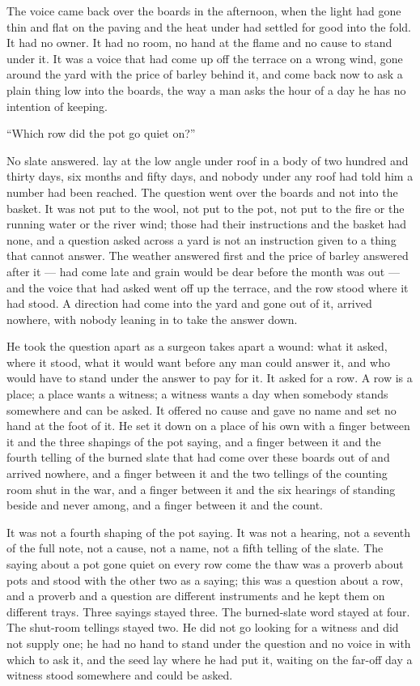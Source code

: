 The voice came back over the boards in the afternoon, when the light had gone thin and flat on the paving and the heat under  had settled for good into the fold. It had no owner. It had no room, no hand at the flame and no cause to stand under it. It was a voice that had come up off the terrace on a wrong wind, gone around the yard with the price of barley behind it, and come back now to ask a plain thing low into the boards, the way a man asks the hour of a day he has no intention of keeping.

“Which row did the pot go quiet on?”

No slate answered.  lay at the low angle under  roof in a body of two hundred and thirty days, six months and fifty days, and nobody under any roof had told him a number had been reached. The question went over the boards and not into the basket. It was not put to the wool, not put to the pot, not put to the fire or the running water or the river wind; those had their instructions and the basket had none, and a question asked across a yard is not an instruction given to a thing that cannot answer. The weather answered first and the price of barley answered after it ---  had come late and grain would be dear before the month was out --- and the voice that had asked went off up the terrace, and the row stood where it had stood. A direction had come into the yard and gone out of it, arrived nowhere, with nobody leaning in to take the answer down.

He took the question apart as a surgeon takes apart a wound: what it asked, where it stood, what it would want before any man could answer it, and who would have to stand under the answer to pay for it. It asked for a row. A row is a place; a place wants a witness; a witness wants a day when somebody stands somewhere and can be asked. It offered no cause and gave no name and set no hand at the foot of it. He set it down on a place of his own with a finger between it and the three shapings of the pot saying, and a finger between it and the fourth telling of the burned slate that had come over these boards out of  and arrived nowhere, and a finger between it and the two tellings of the counting room shut in the war, and a finger between it and the six hearings of  standing beside and never among, and a finger between it and the count.

It was not a fourth shaping of the pot saying. It was not a hearing, not a seventh of the full note, not a cause, not a name, not a fifth telling of the slate. The saying about a pot gone quiet on every row come the thaw was a proverb about pots and stood with the other two as a saying; this was a question about a row, and a proverb and a question are different instruments and he kept them on different trays. Three sayings stayed three. The burned-slate word stayed at four. The shut-room tellings stayed two. He did not go looking for a witness and did not supply one; he had no hand to stand under the question and no voice in  with which to ask it, and the seed lay where he had put it, waiting on the far-off day a witness stood somewhere and could be asked.


